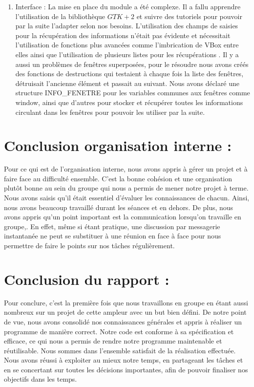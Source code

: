 \documentclass{article}
\begin{document}
\begin{enumerate}
			\item Interface :
			 La mise en place du module a été complexe. Il a fallu apprendre l'utilisation de la bibliothèque $GTK+2$ et suivre des tutoriels pour pouvoir par la suite l'adapter selon nos besoins.  L'utilisation des champs de saisies  pour la récupération des informations n'était pas évidente et nécessitait l'utilisation de fonctions plus avancées comme l'imbrication de VBox entre elles ainsi que l'utilisation de plusieurs listes pour les récupérations . 
Il y a aussi un problèmes de fenêtres superposées,  pour le résoudre nous avons créés des fonctions de destructions qui testaient à chaque fois la liste des fenêtres, détruisait l'ancienne élément et passait au suivant.
Nous avons déclaré une structure INFO\_FENETRE pour les variables communes aux fenêtres comme window, ainsi que d'autres pour stocker et récupérer toutes les informations circulant dans les fenêtres pour pouvoir les utiliser par la suite.      
	\end{enumerate}

\section{Conclusion organisation interne :}
Pour ce qui est de l'organisation interne, nous avons appris à gérer un projet et à faire face au difficulté ensemble. C'est la bonne cohésion et une organisation plutôt bonne au sein du groupe  qui nous a permis de mener notre projet à terme. 
Nous avons saisis qu'il était essentiel d'évaluer les connaissances de chacun. Ainsi, nous avons beaucoup travaillé durant les séances et en dehors.  De plus, nous avons appris qu'un point important est la communication lorsqu'on travaille en groupe,. En effet, même si étant pratique, une discussion par messagerie instantanée ne peut se substituer à une réunion en face à face pour nous permettre de faire le points sur nos tâches régulièrement. 

\section{Conclusion du rapport :}
Pour conclure, c'est la première fois que nous travaillons en groupe en étant aussi nombreux sur un projet de cette ampleur avec un but bien défini. De notre point de vue, nous avons consolidé nos connaissances générales et appris à réaliser un programme de manière correct. 
Notre code est conforme à sa spécification et efficace, ce qui nous a permis de rendre notre programme maintenable et réutilisable. 
Nous sommes dans l'ensemble satisfait de la réalisation effectuée. Nous avons réussi à exploiter au mieux notre temps, en partageant les tâches et en se concertant sur toutes les décisions importantes, afin de pouvoir finaliser nos objectifs dans les temps.
\end{document}
